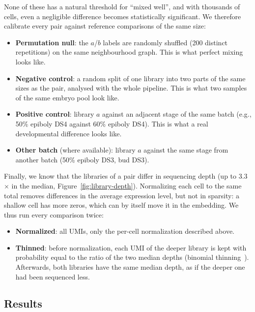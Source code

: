 \documentclass[11pt,a4paper]{article}
\begin{document}
None of these has a natural threshold for ``mixed well'', and with thousands of cells, even a negligible difference becomes statistically significant. We therefore calibrate every pair against reference comparisons of the same size:
\begin{itemize}
	\item \textbf{Permutation null}: the $a$/$b$ labels are randomly shuffled (200 distinct repetitions) on the same neighbourhood graph. This is what perfect mixing looks like.
	\item \textbf{Negative control}: a random split of one library into two parts of the same sizes as the pair, analysed with the whole pipeline. This is what two samples of the same embryo pool look like.
	\item \textbf{Positive control}: library $a$ against an adjacent stage of the same batch (e.g., 50\% epiboly DS4 against 60\% epiboly DS4). This is what a real developmental difference looks like.
	\item \textbf{Other batch} (where available): library $a$ against the same stage from another batch (50\% epiboly DS3, bud DS3).
\end{itemize}
Finally, we know that the libraries of a pair differ in sequencing depth (up to 3.3$\times$ in the median, Figure~\ref{fig:library-depth}). Normalizing each cell to the same total removes differences in the average expression level, but not in sparsity: a shallow cell has more zeros, which can by itself move it in the embedding. We thus run every comparison twice:
\begin{itemize}
	\item \textbf{Normalized}: all UMIs, only the per-cell normalization described above.
	\item \textbf{Thinned}: before normalization, each UMI of the deeper library is kept with probability equal to the ratio of the two median depths (binomial thinning~\cite{gerard2020thinning}). Afterwards, both libraries have the same median depth, as if the deeper one had been sequenced less.
\end{itemize}

\subsection{Results}
\end{document}
